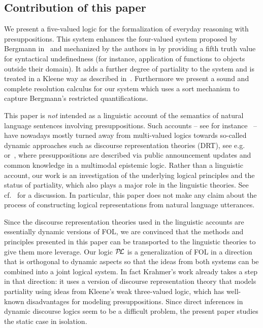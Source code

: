\documentclass{\filespath jancl}
\def\presuppl{{\cal P\kern-.4ex L}}
\begin{document}
\subsection{Contribution of this paper}
\label{sec:contrib}

We present a five-valued logic for the formalization of everyday reasoning with
presuppositions. This system enhances the four-valued system proposed by Berg\-mann
in~\cite{Bergmann:patdl81} and mechanized by the authors in
\cite{KeKo:arcfp96} by providing a fifth truth value for syntactical
undefinedness
(for instance, application of functions to objects outside their domain). It adds a
further degree of partiality to the system and is treated in a Kleene way as described
in~\cite{KeKo94,KeKo:atcfpf96}. Furthermore we present a sound and complete
resolution calculus for our system which uses a sort mechanism to capture
Bergmann's restricted quantifications.

This paper is {\em not\/} intended as a linguistic account of the semantics of
natural language sentences involving presuppositions. Such accounts -- see for
instance~\cite{Sandt:ppaar92,Krahmer:dap95,Beaver:p97,BeaZee:a07} -- have
nowadays mostly turned away from multi-valued logics towards so-called dynamic
approaches such as discourse representation theories (DRT), see
e.g.~\cite{KamRey:fdtl93} or~\cite{EijckUnger07}, where
presuppositions are described via
public announcement updates and common knowledge in a multimodal
epistemic logic. Rather than a linguistic account, our work is an
investigation of the underlying logical principles and the status of
partiality, which also plays a major role in the linguistic theories.
See cf.~\cite{Krahmer:dap95} for a discussion. In particular, this paper does
not make any claim about the process of constructing logical representations
from natural language utterances.

Since the discourse representation theories used in the linguistic accounts are
essentially dynamic versions of FOL, we are convinced that the methods and principles
presented in this paper can be transported to the linguistic theories to give them more
leverage.  Our logic $\presuppl$ is a generalization of FOL in a direction that is
orthogonal to dynamic aspects so that the ideas from both systems can be combined into a
joint logical system. In fact Krahmer's work already takes a step in that direction: it
uses a version of discourse representation theory that models partiality using ideas from
Kleene's weak three-valued logic, which has well-known disadvantages for modeling
presuppositions. Since direct inferences in dynamic discourse logics seem to be a
difficult problem, the present paper studies the static case in isolation.
\end{document}
